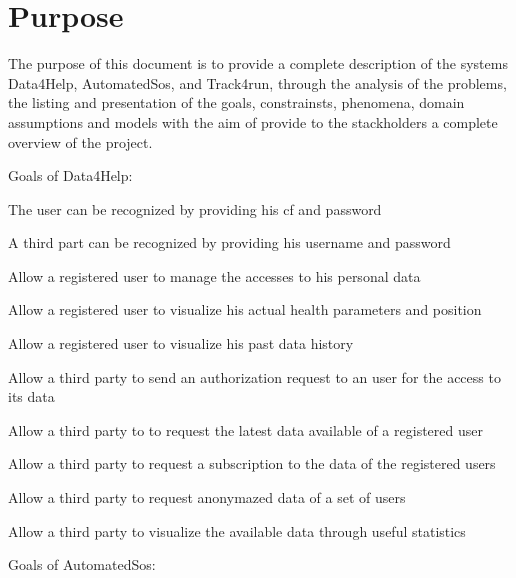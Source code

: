 \section{Purpose}
The purpose of this document is to provide a complete description of the systems Data4Help, AutomatedSos, and Track4run, through the analysis of the problems, the listing and presentation of the goals, constrainsts, phenomena, domain assumptions and models with the aim of provide to the stackholders a complete overview of the project.

Goals of Data4Help:
\begin{goalList}
\begin{enumerate}[label={[}G 1.\arabic*{]}]
\item \label{goal:user0}The user can be recognized by providing his cf and password
\item \label{goal:user00}A third part can be recognized by providing his username and password

    \item \label{goal:user1} Allow a registered user to manage the accesses to his personal data
    \item \label{goal:user2}Allow a registered user to visualize his actual health parameters and position
    \item \label{goal:user3}Allow a registered user to visualize his past data history
    
     \item \label{goal:parties1}Allow a third party to send an authorization request to an user for the access to its data
     \item \label{goal:parties2}Allow a third party to to request the latest data available of a registered user
 
    \item \label{goal:parties3}Allow a third party to request a subscription to the data of the registered users
    
    \item \label{goal:parties4}Allow a third party to request anonymazed data of a set of users 
    
    \item \label{goal:parties5}Allow a third party to visualize the available data through useful statistics 


\end{enumerate}
Goals of AutomatedSos:
\begin{enumerate}[label={[}G 2.\arabic*{]}]


\end{enumerate}
\end{goalList}
